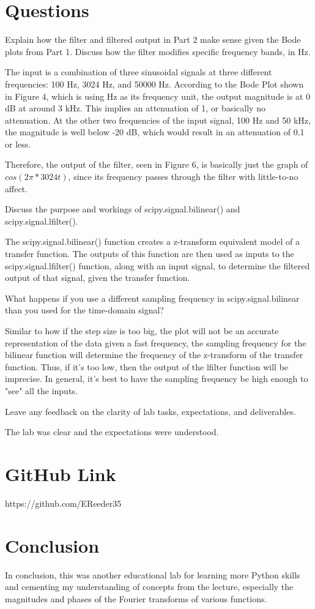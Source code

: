 \documentclass[12pt]{article}
\begin{document}
\newpage

\section{Questions}

Explain how the filter and filtered output in Part 2 make sense given the Bode plots from Part 1. Discuss how the filter modifies specific frequency bands, in Hz.

The input is a combination of three sinusoidal signals at three different frequencies: 100 Hz, 3024 Hz, and 50000 Hz. According to the Bode Plot shown in Figure 4, which is using Hz as its frequency unit, the output magnitude is at 0 dB at around 3 kHz. This implies an attenuation of 1, or basically no attenuation. At the other two frequencies of the input signal, 100 Hz and 50 kHz, the magnitude is well below -20 dB, which would result in an attenuation of 0.1 or less.

Therefore, the output of the filter, seen in Figure 6, is basically just the graph of $cos(2 \pi * 3024t)$, since its frequency passes through the filter with little-to-no affect.

Discuss the purpose and workings of scipy.signal.bilinear() and scipy.signal.lfilter().

The scipy.signal.bilinear() function creates a z-transform equivalent model of a transfer function. The outputs of this function are then used as inputs to the scipy.signal.lfilter() function, along with an input signal, to determine the filtered output of that signal, given the transfer function.

What happens if you use a different sampling frequency in scipy.signal.bilinear than you used for the time-domain signal?

Similar to how if the step size is too big, the plot will not be an accurate representation of the data given a fast frequency, the sampling frequency for the bilinear function will determine the frequency of the z-transform of the transfer function. Thus, if it's too low, then the output of the lfilter function will be imprecise. In general, it's best to have the sampling frequency be high enough to "see" all the inputs.

Leave any feedback on the clarity of lab tasks, expectations, and deliverables.

The lab was clear and the expectations were understood.

\section{GitHub Link}

https://github.com/EReeder35

\section{Conclusion}

In conclusion, this was another educational lab for learning more Python skills and cementing my understanding of concepts from the lecture, especially the magnitudes and phases of the Fourier transforms of various functions.
\end{document}
